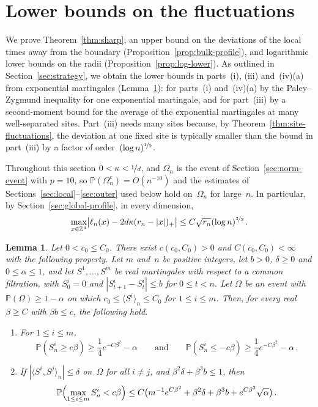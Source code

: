 \documentclass[11pt]{amsart}
\theoremstyle{plain}
\newtheorem{lemma}[theorem]{Lemma}
\theoremstyle{definition}
\newcommand{\Z}{\mathbb Z}
\renewcommand{\P}{\mathbb P}
\newcommand{\drift}{\kappa}
\newcommand{\nf}{\nicefrac}
\numberwithin{equation}{section}
\begin{document}
\section{Lower bounds on the fluctuations}\label{sec:lower}

We prove Theorem~\ref{thm:sharp}, an upper bound on the deviations of the local times away from the boundary (Proposition~\ref{prop:bulk-profile}), and logarithmic lower bounds on the radii (Proposition~\ref{prop:log-lower}). As outlined in Section~\ref{sec:strategy}, we obtain the lower bounds in parts~(i), (iii) and~(iv)(a) from exponential martingales (Lemma~\ref{lem:exp-deviation}): for parts~(i) and~(iv)(a) by the Paley--Zygmund inequality for one exponential martingale, and for part~(iii) by a second-moment bound for the average of the exponential martingales at many well-separated sites. Part~(iii) needs many sites because, by Theorem~\ref{thm:site-fluctuations}, the deviation at one fixed site is typically smaller than the bound in part~(iii) by a factor of order~$(\log n)^{\nf12}$.

Throughout this section $0<\drift<\nf1d$, and $\Omega_n$ is the event of Section~\ref{sec:norm-event} with $p=10$, so $\P(\Omega_n^c)=O(n^{-10})$ and the estimates of Sections~\ref{sec:local}--\ref{sec:outer} used below hold on~$\Omega_n$ for large~$n$. In particular, by Section~\ref{sec:global-profile}, in every dimension,
\begin{equation}\label{eq:lower-local-error}
\max_{x\in\Z^d}\bigl|\ell_n(x)-2d\drift(r_n-|x|)_+\bigr|\leq C\sqrt{r_n}(\log n)^{\nf32}\, .
\end{equation}

\begin{lemma}\label{lem:exp-deviation}
Let $0<c_0\leq C_0$. There exist $c(c_0,C_0)>0$ and $C(c_0,C_0)<\infty$ with the following property. Let $m$ and~$n$ be positive integers, let $b>0$, $\delta\geq0$ and $0\leq\alpha\leq1$, and let $S^1,\ldots,S^m$ be real martingales with respect to a common filtration, with $S^i_0=0$ and $|S^i_{t+1}-S^i_t|\leq b$ for $0\leq t<n$. Let $\Omega$ be an event with $\P(\Omega)\geq1-\alpha$ on which $c_0\leq\langle S^i\rangle_n\leq C_0$ for $1\leq i\leq m$. Then, for every real $\beta\geq C$ with $\beta b\leq c$, the following hold.
\begin{enumerate}[label=\textup{(\roman*)}]
\item For $1\leq i\leq m$,
\begin{equation*}
\P(S^i_n\geq c\beta)\geq\frac14e^{-C\beta^2}-\alpha
\qquad\text{and}\qquad
\P(S^i_n\leq-c\beta)\geq\frac14e^{-C\beta^2}-\alpha\, .
\end{equation*}
\item If $|\langle S^i,S^j\rangle_n|\leq\delta$ on~$\Omega$ for all $i\neq j$, and $\beta^2\delta+\beta^3b\leq1$, then
\begin{equation*}
\P\Bigl(\max_{1\leq i\leq m}S^i_n<c\beta\Bigr)\leq C\bigl(m^{-1}e^{C\beta^2}+\beta^2\delta+\beta^3b+e^{C\beta^2}\sqrt\alpha\bigr)\, .
\end{equation*}
\end{enumerate}
\end{lemma}
\end{document}
